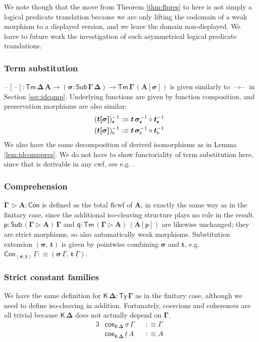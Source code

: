 \documentclass[12pt,a4paper,twoside,openany]{book}
\theoremstyle{remark}
\theoremstyle{definition}
\theoremstyle{theorem}
\newcommand{\bs}[1]{\boldsymbol{#1}}
\newcommand{\Con}{\mathsf{Con}}
\newcommand{\Sub}{\mathsf{Sub}}
\newcommand{\Tm}{\mathsf{Tm}}
\newcommand{\Ty}{\mathsf{Ty}}
\newcommand{\blank}{\mathord{\hspace{1pt}\text{--}\hspace{1pt}}}
\newcommand{\ra}{\rightarrow}
\newcommand{\ext}{\triangleright}
\newcommand{\emptycon}{\scaleobj{.75}\bullet}
\newcommand{\p}{\mathsf{p}}
\newcommand{\q}{\mathsf{q}}
\newcommand{\K}{\mathsf{K}}
\newcommand{\bGamma}{\bs{\Gamma}}
\newcommand{\bDelta}{\bs{\Delta}}
\newcommand{\bsigma}{\bs{\sigma}}
\newcommand{\bt}{\bs{t}}
\newcommand{\bA}{\bs{A}}
\newcommand{\bK}{\bs{\mathsf{K}}}
\newcommand{\ul}[1]{\underline{#1}}
\newcommand{\ulGamma}{\ul{\Gamma}}
\newcommand{\ulsigma}{\ul{\sigma}}
\newcommand{\ult}{\ul{t}}
\newcommand{\coe}{\mathsf{coe}}
\newcommand{\defn}{:\equiv}
\begin{document}
We note though that the move from Theorem \ref{thm:flpres} to here is not simply
a logical predicate translation because we are only lifting the codomain of a
weak morphism to a displayed version, and we leave the domain non-displayed. We
leave to future work the investigation of such asymmetrical logical predicate
translations.



\subsubsection{Term substitution}

$\bs{\blank[\blank] : \Tm\,\Delta\,A \ra (\sigma : \Sub\,\Gamma\,\Delta)
  \ra \Tm\,\Gamma\,(A[\sigma])}$ is given similarly to
$\bs{\blank\!\circ\!\blank}$ in Section \ref{sec:idcomp}. Underlying functions
are given by function composition, and preservation morphisms are also similar:
\begin{alignat*}{3}
  & (\bs{t[\sigma]})_{\emptycon}^{-1} \defn
    \bt\,\bsigma_{\emptycon}^{-1} \circ \bt_{\emptycon}^{-1} \\
  & (\bs{t[\sigma]})_{\ext}^{-1} \defn
    \bt\,\bsigma_{\ext}^{-1} \circ \bt_{\ext}^{-1}
\end{alignat*}
We also have the same decomposition of derived isomorphisms as in Lemma
\ref{lem:idcomppres}. We do not have to show functoriality of term substitution
here, since that is derivable in any cwf, see e.g. \cite{kaposi2019constructing}.

\subsubsection{Comprehension}

$\bs{\Gamma\,\ext A : \Con}$ is defined as the total flcwf of $\bA$, in exactly
the same way as in the finitary case, since the additional iso-cleaving
structure plays no role in the result. $\bs{\p : \Sub\,(\Gamma\ext A)\,\Gamma}$
and $\bs{\q : \Tm\,(\Gamma\ext A)\,(A[\p])}$ are likewise unchanged; they are
strict morphisms, so also automatically weak morphisms. Substitution extension
$\bs{(\sigma,\,t)}$ is given by pointwise combining $\bsigma$ and $\bt$,
e.g.\ $\Con_{\bs{(\sigma,t)}}\,\ulGamma \defn (\bsigma\,\ulGamma,\,\bt\,\ulGamma)$.

\subsubsection{Strict constant families}
We have the same definition for $\bs{\K\,\Delta : \Ty\,\Gamma}$ as in the
finitary case, although we need to define iso-cleaving in addition. Fortunately,
coercions and coherences are all trivial because $\bK\,\bDelta$ does not actually
depend on $\bGamma$.
\begin{alignat*}{3}
  &\coe_{\bs{\K\,\Delta}}\,\ulsigma\,\Gamma &&\defn \Gamma\\
  &\coe_{\bs{\K\,\Delta}}\,\ult\,A          &&\defn A
\end{alignat*}
\end{document}
